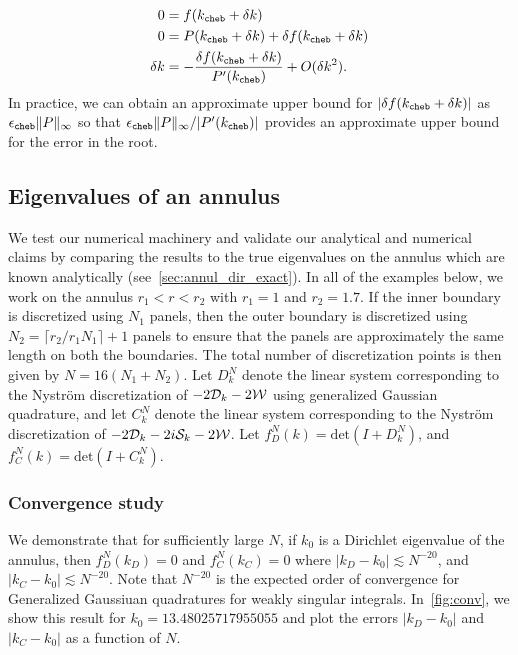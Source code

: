 \begin{align*}
  0 &= f(k_{\texttt{cheb}} + \delta k) \\
  0 &= P(k_{\texttt{cheb}} + \delta k) + \delta f(k_{\texttt{cheb}} + \delta k) \\
  \delta k &= -\frac{\delta f(k_{\texttt{cheb}} + \delta k)}{P'(k_{\texttt{cheb}})} + O(\delta k^2) .
\end{align*}
In practice, we can obtain an approximate upper
bound for $|\delta f(k_{\texttt{cheb}}+\delta k)|$
as ${\epsilon_{\texttt{cheb}}} \|P\|_\infty$ so that ${\epsilon_{\texttt{cheb}}} \|P\|_\infty/
|P'(k_{\texttt{cheb}})|$ provides an approximate upper bound
for the error in the root.

\subsection{Eigenvalues of an annulus}
We test our numerical machinery and validate our analytical 
and numerical claims
by comparing the results to the true eigenvalues on the annulus
which are known analytically (see~\cref{sec:annul_dir_exact}).
In all of the examples below, we work on the annulus $r_{1}<r<r_{2}$
with $r_{1} = 1$ and $r_{2} = 1.7$.
If the inner boundary is discretized using $N_{1}$ panels, 
then the outer boundary is discretized using $N_{2} = 
\lceil r_{2}/r_{1} N_{1} \rceil +1$ panels to ensure that the
panels are approximately the same length on both the boundaries. 
The total number of discretization points 
is then given by $N = 16(N_{1} + N_{2})$.
Let $D^{N}_{k}$ denote the linear system corresponding
to the Nystr\"{o}m discretization of
$-2{\mathcal D}_{k} -2{\mathcal W}$ using generalized Gaussian quadrature, 
and let $C^{N}_{k}$ denote the linear system corresponding
to the Nystr\"{o}m discretization of 
$-2{\mathcal D}_{k} - 2i{\mathcal S}_{k} -2{\mathcal W}$.
Let $f_{D}^{N}(k) = \text{det}(I+D^{N}_{k})$, and 
$f_{C}^{N}(k) = \text{det}(I+C^{N}_{k})$.

\subsubsection{Convergence study}
\label{subsec:convannulus}
We demonstrate that 
for sufficiently large $N$, if $k_{0}$ is a Dirichlet 
eigenvalue of the annulus, 
then $f_{D}^{N}(k_{D}) = 0$ and $f_{C}^{N}(k_{C}) = 0$
where $|k_{D} - k_{0}| \lesssim N^{-20}$, 
and $|k_{C} - k_{0}| \lesssim N^{-20}$.
Note that $N^{-20}$ is the expected order of
convergence for Generalized Gaussiuan quadratures for weakly 
singular integrals.
In~\cref{fig:conv}, we show this result for $k_{0} = 13.48025717955055$
and plot the errors $|k_{D}-k_{0}|$ and $|k_{C}-k_{0}|$ as a function
of $N$. 

